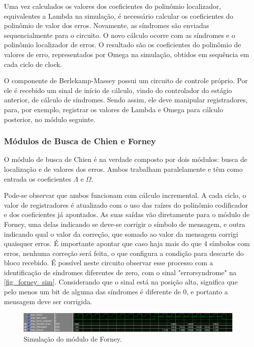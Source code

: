 	Uma vez calculados os valores dos coeficientes do polinômio localizador, equivalentes a Lambda na simulação, é necessário calcular os coeficientes do polinômio de valor dos erros. Novamente, as síndromes são enviadas sequencialmente para o circuito. O novo cálculo ocorre com as síndromes e o polinômio localizador de erros. O resultado são os coeficientes do polinômio de valores de erro, representados por Omega na simulação, obtidos em sequência em cada ciclo de clock. 
	
	O componente de Berlekamp-Massey possui um circuito de controle próprio. Por ele é recebido um sinal de início de cálculo, vindo do controlador do estágio anterior, de cálculo de síndromes. Sendo assim, ele deve manipular registradores, para, por exemplo, registrar os valores de Lambda e Omega para cálculo posterior, no módulo seguinte.
	
	\subsubsection{Módulos de Busca de Chien e Forney}
	
	O módulo de busca de Chien é na verdade composto por dois módulos: busca de localização e de valores dos erros. Ambos trabalham paralelamente e têm como entrada os coeficientes $\Lambda$ e $\Omega$. 
	
	Pode-se observar que ambos funcionam com cálculo incremental. A cada ciclo, o valor de registradores é atualizado com o uso das raízes do polinômio codificador e dos coeficientes já apontados. As suas saídas vão diretamente para o módulo de Forney, uma delas indicando se deve-se corrigir o símbolo de mensagem, e outra indicando qual o valor da correção, que somado ao valor da mensagem corrigi quaisquer erros. É importante apontar que caso haja mais do que 4 símbolos com erros, nenhuma correção será feita, o que configura a condição para descarte do bloco recebido. É possível neste circuito observar esse processo com a identificação de síndromes diferentes de zero, com o sinal "errorsyndrome" na \autoref{fig_forney_sim}. Considerando que o sinal está na posição alta, significa que pelo menos um bit de alguma das síndromes é diferente de 0, e portanto a mensagem deve ser corrigida. 
	
	\begin{figure}[!htb]
		\caption{\label{fig_forney_sim}Simulação do módulo de Forney.}
		\centering
		\includegraphics[width=1\textwidth]{RS/Sim_forney.PNG}
	\end{figure}
	
